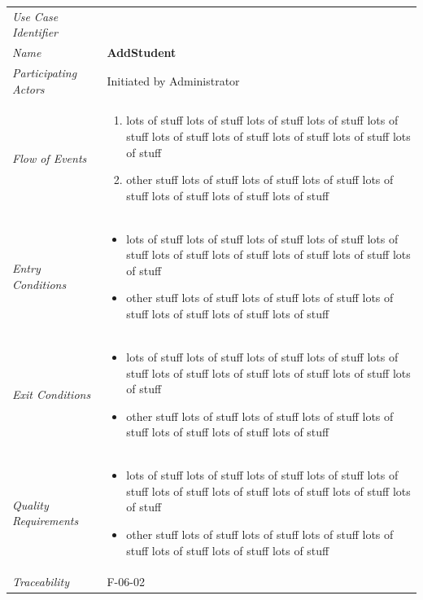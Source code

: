 \documentclass[12pt,letterpaper]{article}
\begin{document}
\begin{center}
	\begin{tabu} to 
		\toprule
		Use Case Identifier & \addstudent{} \\
		Name & {\bf AddStudent} \\
		Participating Actors & Initiated by Administrator \\
		Flow of Events & 
	    \begin{enumerate}[topsep=-1em]
		    \item lots of stuff lots of stuff lots of stuff lots of stuff lots of stuff lots of stuff lots of stuff lots of stuff lots of stuff lots of stuff
		    \item other stuff lots of stuff lots of stuff lots of stuff lots of stuff lots of stuff lots of stuff lots of stuff
		\end{enumerate} \\

		Entry Conditions &
		\begin{itemize}[topsep=-1em]
		    \item lots of stuff lots of stuff lots of stuff lots of stuff lots of stuff lots of stuff lots of stuff lots of stuff lots of stuff lots of stuff
		    \item other stuff lots of stuff lots of stuff lots of stuff lots of stuff lots of stuff lots of stuff lots of stuff
        \end{itemize} \\

		Exit Conditions &
		\begin{itemize}[topsep=-1em]
		    \item lots of stuff lots of stuff lots of stuff lots of stuff lots of stuff lots of stuff lots of stuff lots of stuff lots of stuff lots of stuff
		    \item other stuff lots of stuff lots of stuff lots of stuff lots of stuff lots of stuff lots of stuff lots of stuff
        \end{itemize} \\

		Quality Requirements &
		\begin{itemize}[topsep=-1em]
		    \item lots of stuff lots of stuff lots of stuff lots of stuff lots of stuff lots of stuff lots of stuff lots of stuff lots of stuff lots of stuff
		    \item other stuff lots of stuff lots of stuff lots of stuff lots of stuff lots of stuff lots of stuff lots of stuff
        \end{itemize} \\

		Traceability & F-06-02 \\
		\toprule
	\end{tabu}
\end{center}
\end{document}
